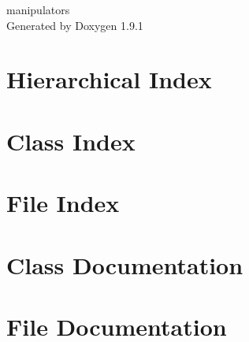 \let\mypdfximage\pdfximage\def\pdfximage{\immediate\mypdfximage}\documentclass[twoside]{book}
\newcommand{\+}{\discretionary{\mbox{\scriptsize$\hookleftarrow$}}{}{}}
\newcommand{\clearemptydoublepage}{%
  \newpage{\pagestyle{empty}\cleardoublepage}%
}
\begin{document}
\raggedbottom

\hypersetup{pageanchor=false,
             bookmarksnumbered=true,
             pdfencoding=unicode
            }
\begin{titlepage}
\vspace*{7cm}
\begin{center}%
{\Large manipulators }\\
\vspace*{1cm}
{\large Generated by Doxygen 1.9.1}\\
\end{center}
\end{titlepage}
\clearemptydoublepage
{}
\tableofcontents
\clearemptydoublepage
{}
\hypersetup{pageanchor=true}

\chapter{Hierarchical Index}

\chapter{Class Index}

\chapter{File Index}

\chapter{Class Documentation}









\chapter{File Documentation}


\backmatter
\newpage
{}
\clearemptydoublepage
{}
\printindex
\end{document}
